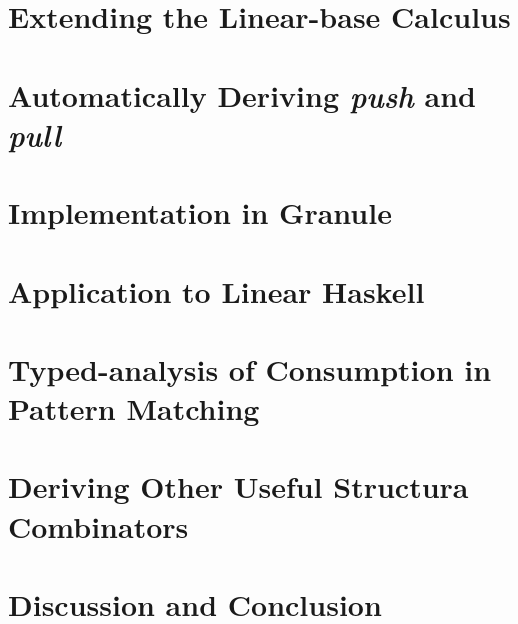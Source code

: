 

\section{Extending the Linear-base Calculus}
\label{sec:der-calculus}


\section{Automatically Deriving \emph{push} and \emph{pull}}
\label{sec:push-pull}


\section{Implementation in Granule}
\label{sec:implementaton}


\section{Application to Linear Haskell}
\label{sec:der-linhaskell}


\section{Typed-analysis of Consumption in Pattern Matching}
\label{sec:matching-and-consumption}


\section{Deriving Other Useful Structura Combinators}
\label{sec:other}


\section{Discussion and Conclusion}
\label{sec:der-conclusion}



